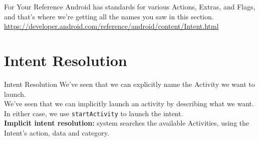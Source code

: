 \documentclass[aspectratio=169]{beamer}
\begin{document}
\begin{frame}{For Your Reference}
\Large
Android has standards for various Actions, Extras, and Flags, and that's where we're getting all the names you saw in this section. \\
\vspace{2em}
\url{https://developer.android.com/reference/android/content/Intent.html}
\end{frame}



\section*{Intent Resolution}



\begin{frame}{Intent Resolution}
\large
We've seen that we can explicitly name the Activity we want to launch. \\
\vspace{1em}
We've seen that we can implicitly launch an activity by describing what we want. \\
\vspace{1em}
In either case, we use {\tt startActivity} to launch the intent.\\
\vspace{1em}
\textbf{Implicit intent resolution:} system searches the
available Activities, using the Intent's action, data
and category.
\end{frame}
\end{document}
